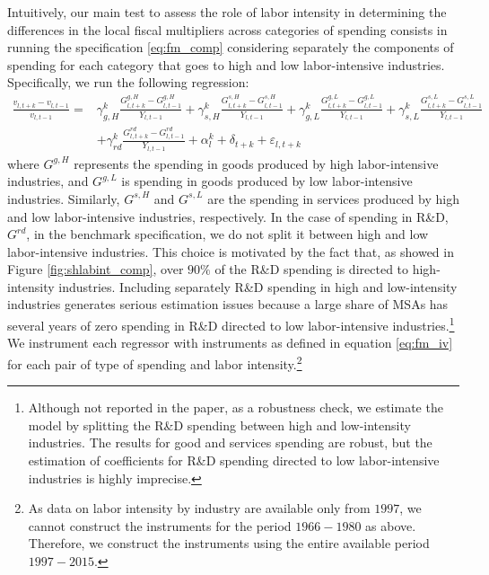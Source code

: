 \documentclass[dv_diss_main.tex]{subfiles}
\begin{document}
Intuitively, our main test to assess the role of labor intensity in determining the differences in the local fiscal multipliers across categories of spending consists in running the specification \ref{eq:fm_comp} considering separately the components of spending for each category that goes to high and low labor-intensive industries. Specifically, we run the following regression: 
\begin{equation}
\begin{split}
    \frac{v_{l,t+k} - v_{l,t-1}}{v_{l,t-1}}  = & \gamma_{g,H}^k \frac{G^{g,H}_{l,t+k}-G^{g,H}_{l,t-1}}{Y_{l,t-1}} + \gamma_{s,H}^k \frac{G^{s,H}_{l,t+k}-G^{s,H}_{l,t-1}}{Y_{l,t-1}} + \gamma_{g,L}^k \frac{G^{g,L}_{l,t+k}-G^{g,L}_{l,t-1}}{Y_{l,t-1}} + \gamma_{s,L}^k \frac{G^{s,L}_{l,t+k}-G^{s,L}_{l,t-1}}{Y_{l,t-1}} \\[0.1in] 
    & + \gamma_{rd}^k \frac{G^{rd}_{l,t+k}-G^{rd}_{l,t-1}}{Y_{l,t-1}} + \alpha_l^k + \delta_{t+k} + \varepsilon_{l,t+k}
\end{split}
\label{eq:fm_comp_labint}
\end{equation}
where $G^{g,H}$ represents the spending in goods produced by high labor-intensive industries, and $G^{g,L}$ is spending in goods produced by low labor-intensive industries. Similarly,  $G^{s,H}$ and $G^{s,L}$ are the spending in services produced by high and low labor-intensive industries, respectively. In the case of spending in R\&D, $G^{rd}$, in the benchmark specification, we do not split it between high and low labor-intensive industries. This choice is motivated by the fact that, as showed in Figure \ref{fig:shlabint_comp}, over $90\%$ of the R\&D spending is directed to high-intensity industries. Including separately R\&D spending in high and low-intensity industries generates serious estimation issues because a large share of MSAs has several years of zero spending in R\&D directed to low labor-intensive industries.\footnote{Although not reported in the paper, as a robustness check, we estimate the model by splitting the R\&D spending between high and low-intensity industries. The results for good and services spending are robust, but the estimation of coefficients for R\&D spending directed to low labor-intensive industries is highly imprecise.} We instrument each regressor with instruments as defined in equation \eqref{eq:fm_iv} for each pair of type of spending and labor intensity.\footnote{As data on labor intensity by industry are available only from $1997$, we cannot construct the instruments for the period $1966-1980$ as above. Therefore, we construct the instruments using the entire available period $1997-2015$.}
\end{document}
